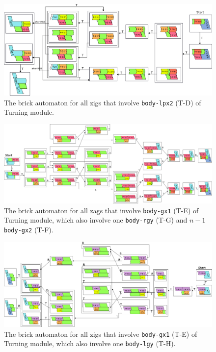\documentclass[dvipdfmx,review]{elsarticle}
\begin{document}
\begin{figure}[ht]
\centering
\includegraphics[width=\linewidth]{Figs/Turner_BA/T-D_ver2.png}
\caption{The brick automaton for all zigs that involve \texttt{body-lpx2} (T-D) of Turning module.}
\label{fig:BA_T-D}
\end{figure}

\begin{figure}[ht]
\centering
\includegraphics[width=\linewidth]{Figs/Turner_BA/gx_right_ver3.png}
\caption{The brick automaton for all zags that involve \texttt{body-gx1} (T-E) of Turning module, which also involve one \texttt{body-rgy} (T-G) and $n-1$ \texttt{body-gx2} (T-F).}
\label{fig:BA_gx_right}
\end{figure}

\begin{figure}[ht]
\centering
\includegraphics[width=\linewidth]{Figs/Turner_BA/gx_left.png}
\caption{The brick automaton for all zigs that involve \texttt{body-gx1} (T-E) of Turning module, which also involve one \texttt{body-lgy} (T-H).}
\label{fig:BA_gx_left}
\end{figure}
\end{document}
